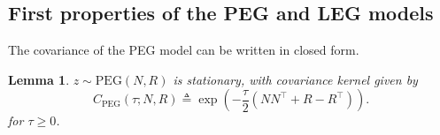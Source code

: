 \documentclass{article}
\newtheorem{lemma}{Lemma}
\theoremstyle{definition}
\newcommand{\PEG}{\mathrm{PEG}}
\newcommand{\PEGGP}{\mathrm{PEG}}
\begin{document}
                                    


\subsection{First properties of the PEG and LEG models}

The covariance of the PEG model can be written in closed form.

\begin{lemma} \label{lem:props} $z \sim \PEGGP(N,R)$ is stationary, with covariance kernel given by
\[
C_{\PEG}(\tau;N,R)  \triangleq 
\exp\left(-\frac{\tau}{2}\left(N N^\top + R-R^\top\right)\right).
\]
for $\tau\geq 0$.
\end{lemma}
\end{document}
